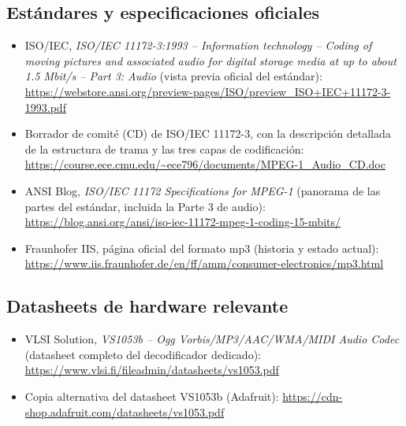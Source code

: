 \documentclass[pdflatex,sn-mathphys-num]{sn-jnl}%
\begin{document}
\subsection{Estándares y especificaciones oficiales}
\begin{itemize}
    \item ISO/IEC, \textit{ISO/IEC 11172-3:1993 -- Information technology -- Coding of moving pictures and associated audio for digital storage media at up to about 1.5 Mbit/s -- Part 3: Audio} (vista previa oficial del estándar): \url{https://webstore.ansi.org/preview-pages/ISO/preview_ISO+IEC+11172-3-1993.pdf}
    \item Borrador de comité (CD) de ISO/IEC 11172-3, con la descripción detallada de la estructura de trama y las tres capas de codificación: \url{https://course.ece.cmu.edu/~ece796/documents/MPEG-1_Audio_CD.doc}
    \item ANSI Blog, \textit{ISO/IEC 11172 Specifications for MPEG-1} (panorama de las partes del estándar, incluida la Parte 3 de audio): \url{https://blog.ansi.org/ansi/iso-iec-11172-mpeg-1-coding-15-mbits/}
    \item Fraunhofer IIS, página oficial del formato mp3 (historia y estado actual): \url{https://www.iis.fraunhofer.de/en/ff/amm/consumer-electronics/mp3.html}
\end{itemize}

\subsection{Datasheets de hardware relevante}
\begin{itemize}
    \item VLSI Solution, \textit{VS1053b -- Ogg Vorbis/MP3/AAC/WMA/MIDI Audio Codec} (datasheet completo del decodificador dedicado): \url{https://www.vlsi.fi/fileadmin/datasheets/vs1053.pdf}
    \item Copia alternativa del datasheet VS1053b (Adafruit): \url{https://cdn-shop.adafruit.com/datasheets/vs1053.pdf}
\end{itemize}
\end{document}
